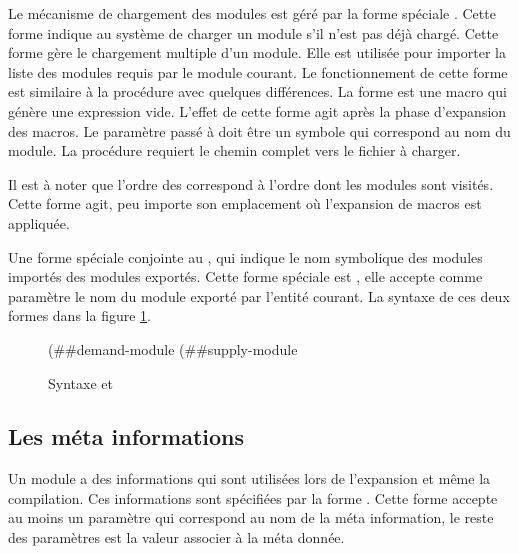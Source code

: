 Le mécanisme de chargement des modules est géré par la forme spéciale
. Cette forme indique au système de charger un module
s'il n'est pas déjà chargé. Cette forme gère le chargement multiple d'un
module. Elle est utilisée pour importer la liste des modules requis par le
module courant.  Le fonctionnement de cette forme est similaire à la procédure
 avec quelques différences. La forme  est
une macro qui génère une expression vide. L'effet de cette forme agit après la
phase d'expansion des macros. Le paramètre passé à 
doit être un symbole qui correspond au nom du module. La procédure 
requiert le chemin complet vers le fichier à charger.

Il est à noter que l'ordre des  correspond à l'ordre
dont les modules sont visités. Cette forme agit, peu importe son emplacement
où l'expansion de macros est appliquée.



Une forme spéciale conjointe au , qui indique le nom
symbolique des modules importés des modules exportés. Cette forme spéciale est
, elle accepte comme paramètre le nom du module exporté
par l'entité courant.  La syntaxe de ces deux formes dans la figure
\ref{fig:syntax->demand/supply-module}.\\
\begin{figure}[ht]
  \centering
  \begin{mplisting}{0.8}
(##demand-module %
(##supply-module %
\end{mplisting}
  \caption{Syntaxe  et }
  \label{fig:syntax->demand/supply-module}
\end{figure}

\subsection{Les méta informations}
Un module a des informations qui sont utilisées lors de l'expansion
et même la compilation. Ces informations sont spécifiées par la forme
. Cette forme accepte au moins un paramètre qui
correspond au nom de la méta information, le reste des paramètres est la valeur
associer à la méta donnée.

